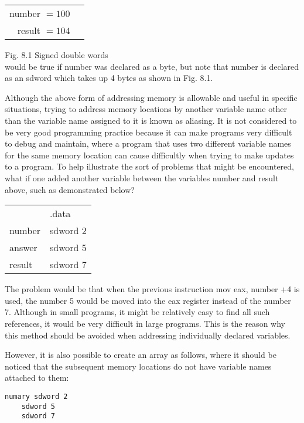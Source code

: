 \documentclass[10pt]{article}
\begin{document}
\begin{center}
\begin{tabular}{rr|}
number $=100$ \\
result $=104$ \\
\end{tabular}
\end{center}

Fig. 8.1 Signed double words\\
would be true if number was declared as a byte, but note that number is declared as an sdword which takes up 4 bytes as shown in Fig. 8.1.

Although the above form of addressing memory is allowable and useful in specific situations, trying to address memory locations by another variable name other than the variable name assigned to it is known as aliasing. It is not considered to be very good programming practice because it can make programs very difficult to debug and maintain, where a program that uses two different variable names for the same memory location can cause difficultly when trying to make updates to a program. To help illustrate the sort of problems that might be encountered, what if one added another variable between the variables number and result above, such as demonstrated below?

\begin{center}
\begin{tabular}{ll}
 & .data \\
number & sdword 2 \\
answer & sdword 5 \\
result & sdword 7 \\
\end{tabular}
\end{center}

The problem would be that when the previous instruction mov eax, number +4 is used, the number 5 would be moved into the eax register instead of the number 7. Although in small programs, it might be relatively easy to find all such references, it would be very difficult in large programs. This is the reason why this method should be avoided when addressing individually declared variables.

However, it is also possible to create an array as follows, where it should be noticed that the subsequent memory locations do not have variable names attached to them:

\begin{verbatim}
numary sdword 2
    sdword 5
    sdword 7
\end{verbatim}
\end{document}
